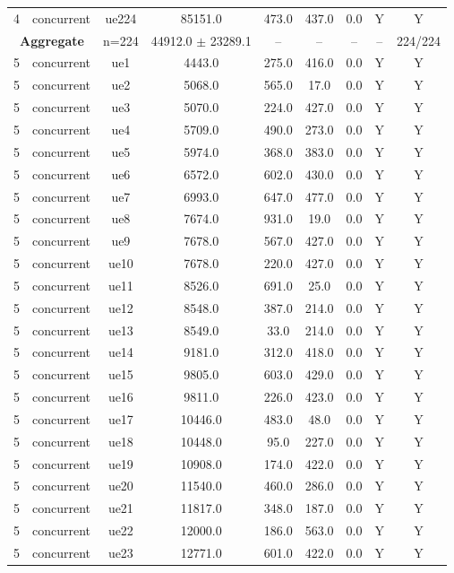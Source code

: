 \begin{table}[ht]
\begin{tabular}{|c|c|c|c|c|c|c|c|c|}
4 & concurrent & ue224 & 85151.0 & 473.0 & 437.0 & 0.0 & Y & Y \\
\multicolumn{2}{|c|}{\textbf{Aggregate}} & n=224 & 44912.0 $\pm$ 23289.1 & -- & -- & -- & -- & 224/224 \\
\hline
5 & concurrent & ue1 & 4443.0 & 275.0 & 416.0 & 0.0 & Y & Y \\
5 & concurrent & ue2 & 5068.0 & 565.0 & 17.0 & 0.0 & Y & Y \\
5 & concurrent & ue3 & 5070.0 & 224.0 & 427.0 & 0.0 & Y & Y \\
5 & concurrent & ue4 & 5709.0 & 490.0 & 273.0 & 0.0 & Y & Y \\
5 & concurrent & ue5 & 5974.0 & 368.0 & 383.0 & 0.0 & Y & Y \\
5 & concurrent & ue6 & 6572.0 & 602.0 & 430.0 & 0.0 & Y & Y \\
5 & concurrent & ue7 & 6993.0 & 647.0 & 477.0 & 0.0 & Y & Y \\
5 & concurrent & ue8 & 7674.0 & 931.0 & 19.0 & 0.0 & Y & Y \\
5 & concurrent & ue9 & 7678.0 & 567.0 & 427.0 & 0.0 & Y & Y \\
5 & concurrent & ue10 & 7678.0 & 220.0 & 427.0 & 0.0 & Y & Y \\
5 & concurrent & ue11 & 8526.0 & 691.0 & 25.0 & 0.0 & Y & Y \\
5 & concurrent & ue12 & 8548.0 & 387.0 & 214.0 & 0.0 & Y & Y \\
5 & concurrent & ue13 & 8549.0 & 33.0 & 214.0 & 0.0 & Y & Y \\
5 & concurrent & ue14 & 9181.0 & 312.0 & 418.0 & 0.0 & Y & Y \\
5 & concurrent & ue15 & 9805.0 & 603.0 & 429.0 & 0.0 & Y & Y \\
5 & concurrent & ue16 & 9811.0 & 226.0 & 423.0 & 0.0 & Y & Y \\
5 & concurrent & ue17 & 10446.0 & 483.0 & 48.0 & 0.0 & Y & Y \\
5 & concurrent & ue18 & 10448.0 & 95.0 & 227.0 & 0.0 & Y & Y \\
5 & concurrent & ue19 & 10908.0 & 174.0 & 422.0 & 0.0 & Y & Y \\
5 & concurrent & ue20 & 11540.0 & 460.0 & 286.0 & 0.0 & Y & Y \\
5 & concurrent & ue21 & 11817.0 & 348.0 & 187.0 & 0.0 & Y & Y \\
5 & concurrent & ue22 & 12000.0 & 186.0 & 563.0 & 0.0 & Y & Y \\
5 & concurrent & ue23 & 12771.0 & 601.0 & 422.0 & 0.0 & Y & Y \\

\end{tabular}
\end{table}
